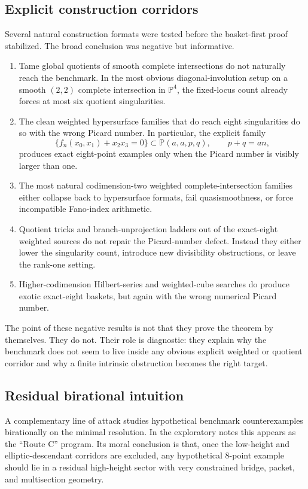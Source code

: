 \documentclass[11pt]{article}
\theoremstyle{definition}
\newcommand{\Pbb}{\mathbb P}
\begin{document}
\subsection*{Explicit construction corridors}
Several natural construction formats were tested before the basket-first proof stabilized.
The broad conclusion was negative but informative.

\begin{enumerate}[label=\textup{(\roman*)}]
\item Tame global quotients of smooth complete intersections do not naturally reach the benchmark. In the most obvious diagonal-involution setup on a smooth $(2,2)$ complete intersection in $\Pbb^4$, the fixed-locus count already forces at most six quotient singularities.
\item The clean weighted hypersurface families that do reach eight singularities do so with the wrong Picard number. In particular, the explicit family
\[
\{f_n(x_0,x_1)+x_2x_3=0\}\subset \Pbb(a,a,p,q),\qquad p+q=an,
\]
produces exact eight-point examples only when the Picard number is visibly larger than one.
\item The most natural codimension-two weighted complete-intersection families either collapse back to hypersurface formats, fail quasismoothness, or force incompatible Fano-index arithmetic.
\item Quotient tricks and branch-unprojection ladders out of the exact-eight weighted sources do not repair the Picard-number defect. Instead they either lower the singularity count, introduce new divisibility obstructions, or leave the rank-one setting.
\item Higher-codimension Hilbert-series and weighted-cube searches do produce exotic exact-eight baskets, but again with the wrong numerical Picard number.
\end{enumerate}

The point of these negative results is not that they prove the theorem by themselves. They do not. Their role is diagnostic: they explain why the benchmark does not seem to live inside any obvious explicit weighted or quotient corridor and why a finite intrinsic obstruction becomes the right target.

\subsection*{Residual birational intuition}
A complementary line of attack studies hypothetical benchmark counterexamples birationally on the minimal resolution. In the exploratory notes this appears as the ``Route C'' program. Its moral conclusion is that, once the low-height and elliptic-descendant corridors are excluded, any hypothetical $8$-point example should lie in a residual high-height sector with very constrained bridge, packet, and multisection geometry.
\end{document}
